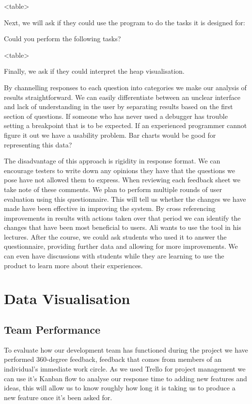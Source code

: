 \documentclass[10pt, a4paper]{article}
\begin{document}
<table>

Next, we will ask if they could use the program to do the tasks it is designed for:

Could you perform the following tasks?


<table>

Finally, we ask if they could interpret the heap visualisation.

By channelling responses to each question into categories we make our analysis of results straightforward. We can easily differentiate between an unclear interface and lack of understanding in the user by separating results based on the first section of questions. If someone who has never used a debugger has trouble setting a breakpoint that is to be expected. If an experienced programmer cannot figure it out we have a usability problem.
Bar charts would be good for representing this data?

The disadvantage of this approach is rigidity in response format. We can encourage testers to write down any opinions they have that the questions we pose have not allowed them to express. When reviewing each feedback sheet we take note of these comments. 
We plan to perform multiple rounds of user evaluation using this questionnaire. This will tell us whether the changes we have made have been effective in improving the system. By cross referencing improvements in results with actions taken over that period we can identify the changes that have been most beneficial to users. Ali wants to use the tool in his lectures. After the course, we could ask students who used it to answer the questionnaire, providing further data and allowing for more improvements. We can even have discussions with students while they are learning to use the product to learn more about their experiences.

\section{Data Visualisation}

\subsection{Team Performance}

To evaluate how our development team has functioned during the project we have performed 360-degree feedback, feedback that comes from members of an individual’s immediate work circle. As we used Trello for project management we can use it’s Kanban flow to analyse our response time to adding new features and ideas, this will allow us to know roughly how long it is taking us to produce a new feature once it’s been asked for.
\end{document}
